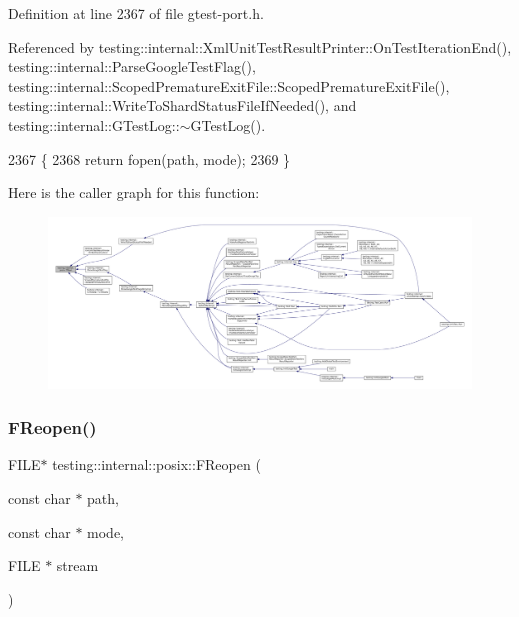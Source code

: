 Definition at line 2367 of file gtest-\/port.\+h.



Referenced by testing\+::internal\+::\+Xml\+Unit\+Test\+Result\+Printer\+::\+On\+Test\+Iteration\+End(), testing\+::internal\+::\+Parse\+Google\+Test\+Flag(), testing\+::internal\+::\+Scoped\+Premature\+Exit\+File\+::\+Scoped\+Premature\+Exit\+File(), testing\+::internal\+::\+Write\+To\+Shard\+Status\+File\+If\+Needed(), and testing\+::internal\+::\+G\+Test\+Log\+::$\sim$\+G\+Test\+Log().


\begin{DoxyCode}
2367                                                        \{
2368   \textcolor{keywordflow}{return} fopen(path, mode);
2369 \}
\end{DoxyCode}
Here is the caller graph for this function\+:
\nopagebreak
\begin{figure}[H]
\begin{center}
\leavevmode
\includegraphics[width=350pt]{namespacetesting_1_1internal_1_1posix_a4042201dcc4932641d484e7ddf94de7d_icgraph}
\end{center}
\end{figure}
\mbox{\label{namespacetesting_1_1internal_1_1posix_a9ef6d089cdae03f9d9e0e6d379c40703}} 
\subsubsection{\texorpdfstring{F\+Reopen()}{FReopen()}}
{\footnotesize\ttfamily F\+I\+LE$\ast$ testing\+::internal\+::posix\+::\+F\+Reopen (\begin{DoxyParamCaption}\item[{const char $\ast$}]{path,  }\item[{const char $\ast$}]{mode,  }\item[{F\+I\+LE $\ast$}]{stream }\end{DoxyParamCaption})\hspace{0.3cm}{\ttfamily [inline]}}



